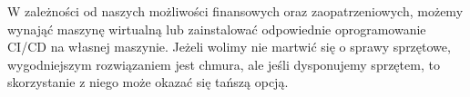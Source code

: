 W zależności od naszych możliwości finansowych oraz zaopatrzeniowych, możemy wynająć maszynę wirtualną
lub zainstalować odpowiednie oprogramowanie CI/CD na własnej maszynie. 
Jeżeli wolimy nie martwić się o sprawy sprzętowe, wygodniejszym rozwiązaniem jest chmura,
ale jeśli dysponujemy sprzętem, to skorzystanie z niego może okazać się tańszą opcją. 
